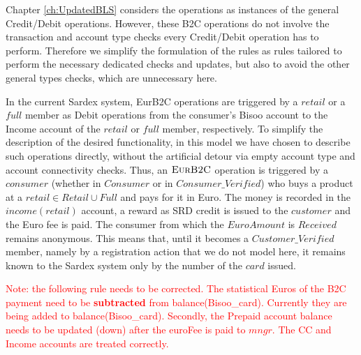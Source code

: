 Chapter \ref{ch:UpdatedBLS} considers the operations as instances of the general Credit/Debit operations. However, these B2C operations do not involve the transaction and account type checks every Credit/Debit operation has to perform. Therefore we simplify the formulation of the rules as rules tailored to perform the necessary dedicated checks and updates, but also to avoid the other general types checks, which are unnecessary here. 

In the current Sardex system, EurB2C operations are triggered by a $retail$ or a $full$ member as Debit operations from the consumer's Bisoo account to the Income account of the $retail$ or $full$ member, respectively. To simplify the description of the desired functionality, in this model we have chosen to describe such operations directly, without the artificial detour via empty account type and account connectivity checks. Thus, an $\hbox{\sc EurB2C}$ operation is triggered by a $consumer$ (whether in $Consumer$ or in $Consumer\_Verified$) who buys a product at a $retail \in Retail \cup Full$ and pays for it in Euro. The money is recorded in the $income(retail)$ account, a reward as SRD credit is issued to the $customer$ and the Euro fee is paid. The consumer from which the $EuroAmount$ is $Received$ remains anonymous. This means that, until it becomes a $Customer\_Verified$ member, namely by a registration action that we do not model here, it remains known to the Sardex system only by the number of the $card$ issued.

\textcolor{red}{Note: the following rule needs to be corrected. The statistical Euros of the B2C payment need to be {\bf subtracted} from balance(Bisoo\_card). Currently they are being added to balance(Bisoo\_card). Secondly, the Prepaid account balance needs to be updated (down) after the euroFee is paid to $mngr$. The CC and Income accounts are treated correctly.}

